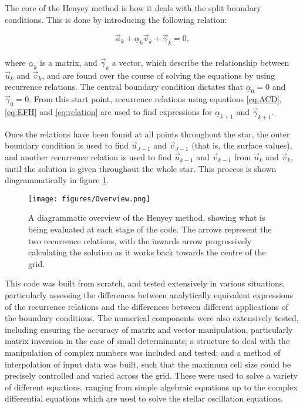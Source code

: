 \documentclass[11pt]{amsart}
\begin{document}
The core of the Henyey method is how it deals with the split boundary conditions.  This is done by introducing the following relation:

\begin{equation} \label{eq:relation}
\vec{u}_{k}  + \underline{\alpha}_{k}  \vec{v}_{k}  + \vec{\gamma}_{k}  = 0,
\end{equation}
\\
where $\underline{\alpha}_{k}$ is a matrix, and $\vec{\gamma}_{k}$ a vector, which describe the relationship between $\vec{u}_{k}$ and $\vec{v}_{k}$, and are found over the course of solving the equations by using recurrence relations.  The central boundary condition dictates that $\underline{\alpha}_{0} = 0$ and $\vec{\gamma}_{0} = 0$.  From this start point, recurrence relations using equations \ref{eq:ACD}, \ref{eq:EFH} and \ref{eq:relation} are used to find expressions for $\underline{\alpha}_{k+1}$ and $\vec{\gamma}_{k+1}$.

Once the relations have been found at all points throughout the star, the outer boundary condition is used to find $\vec{u}_{J-1}$ and $\vec{v}_{J-1}$ (that is, the surface values), and another recurrence relation is used to find $\vec{u}_{k-1}$ and $\vec{v}_{k-1}$ from $\vec{u}_{k}$ and $\vec{v}_{k}$, until the solution is given throughout the whole star.  This process is shown diagrammatically in figure \ref{fig:overview}.









\begin{figure}
\begin{center}
\texttt{[image: figures/Overview.png]}
\caption{A diagrammatic overview of the Henyey method, showing what is being evaluated at each stage of the code.  The arrows represent the two recurrence relations, with the inwards arrow progressively calculating the solution as it works back towards the centre of the grid.}
\label{fig:overview}
\end{center}
\end{figure}


This code was built from scratch, and tested extensively in various situations, particularly assessing the differences between analytically equivalent expressions of the recurrence relations and the differences between different applications of the boundary conditions.  The numerical components were also extensively tested, including ensuring the accuracy of matrix and vector manipulation, particularly matrix inversion in the case of small determinants; a structure to deal with the manipulation of complex numbers was included and tested; and a method of interpolation of input data was built, such that the maximum cell size could be precisely controlled and varied across the grid.  These were used to solve a variety of different equations, ranging from simple algebraic equations up to the complex differential equations which are used to solve the stellar oscillation equations.
\end{document}
